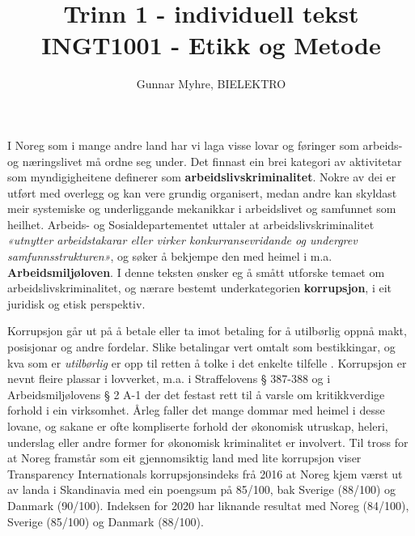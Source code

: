 \documentclass[12pt,a4paper]{article}
\title{%
	Trinn 1 - individuell tekst \\
	\large INGT1001 - Etikk og Metode
	}
\author{Gunnar Myhre, BIELEKTRO}
\begin{document}
  \maketitle
I Noreg som i mange andre land har vi laga visse lovar og føringer som arbeids- og næringslivet må ordne seg under. Det finnast ein brei kategori av aktivitetar som myndigigheitene definerer som \textbf{arbeidslivskriminalitet}. Nokre av dei er utført med overlegg og kan vere grundig organisert, medan andre kan skyldast meir systemiske og underliggande mekanikkar i arbeidslivet og samfunnet som heilhet. Arbeids- og Sosialdepartementet uttaler at arbeidslivskriminalitet \textit{«utnytter arbeidstakarar eller virker konkurransevridande og undergrev samfunnsstrukturen»}\cite{dep}, og søker å bekjempe den med heimel i m.a. \textbf{Arbeidsmiljøloven}. I denne teksten ønsker eg å smått utforske temaet om arbeidslivskriminalitet, og nærare bestemt underkategorien \textbf{korrupsjon}, i eit juridisk og etisk perspektiv.

Korrupsjon går ut på å betale eller ta imot betaling for å utilbørlig oppnå makt, posisjonar og andre fordelar. Slike betalingar vert omtalt som bestikkingar, og kva som er \textit{utilbørlig} er opp til retten å tolke i det enkelte tilfelle \cite{snl}. Korrupsjon er nevnt fleire plassar i lovverket, m.a. i Straffelovens § 387-388 og i Arbeidsmiljølovens § 2 A-1 der det festast rett til å varsle om kritikkverdige forhold i ein virksomhet. Årleg faller det mange dommar med heimel i desse lovane, og sakane er ofte kompliserte forhold der økonomisk utruskap, heleri, underslag eller andre former for økonomisk kriminalitet er involvert. Til tross for at Noreg framstår som eit gjennomsiktig land med lite korrupsjon viser Transparency Internationals korrupsjonsindeks frå 2016 at Noreg kjem værst ut av landa i Skandinavia med ein poengsum på 85/100, bak Sverige (88/100) og Danmark (90/100). Indeksen for 2020 har liknande resultat med Noreg (84/100), Sverige (85/100) og Danmark (88/100).\cite{boka} \cite{transp}
\end{document}
